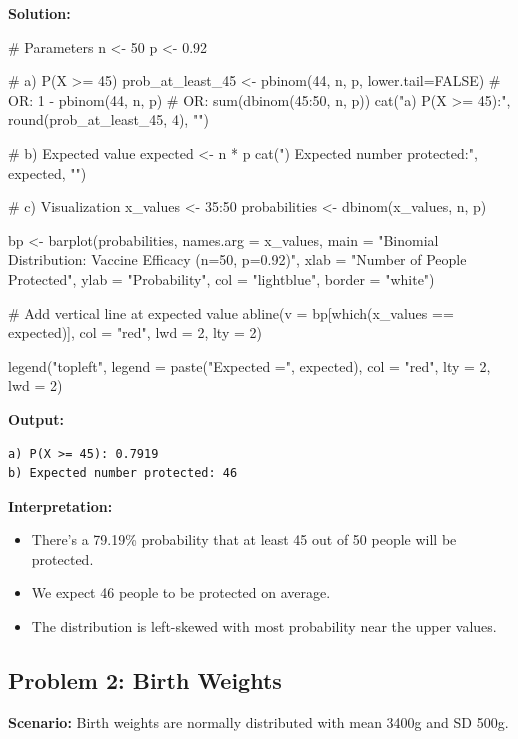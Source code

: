 \documentclass[11pt]{article}
\begin{document}
\textbf{Solution:}

\begin{rcode}
# Parameters
n <- 50
p <- 0.92

# a) P(X >= 45)
prob_at_least_45 <- pbinom(44, n, p, lower.tail=FALSE)
# OR: 1 - pbinom(44, n, p)
# OR: sum(dbinom(45:50, n, p))
cat("a) P(X >= 45):", round(prob_at_least_45, 4), "\n")

# b) Expected value
expected <- n * p
cat("\nb) Expected number protected:", expected, "\n")

# c) Visualization
x_values <- 35:50
probabilities <- dbinom(x_values, n, p)

bp <- barplot(probabilities,
              names.arg = x_values,
              main = "Binomial Distribution: Vaccine Efficacy (n=50, p=0.92)",
              xlab = "Number of People Protected",
              ylab = "Probability",
              col = "lightblue",
              border = "white")

# Add vertical line at expected value
abline(v = bp[which(x_values == expected)], col = "red", lwd = 2, lty = 2)

legend("topleft",
       legend = paste("Expected =", expected),
       col = "red",
       lty = 2,
       lwd = 2)
\end{rcode}

\begin{routput}
\textbf{Output:}
\begin{verbatim}
a) P(X >= 45): 0.7919
b) Expected number protected: 46
\end{verbatim}
\end{routput}

\textcolor{correctgreen}{\textbf{Interpretation:}}
\begin{itemize}
\item There's a 79.19\% probability that at least 45 out of 50 people will be protected.
\item We expect 46 people to be protected on average.
\item The distribution is left-skewed with most probability near the upper values.
\end{itemize}

\subsection{Problem 2: Birth Weights}

\textbf{Scenario:} Birth weights are normally distributed with mean 3400g and SD 500g.
\end{document}
